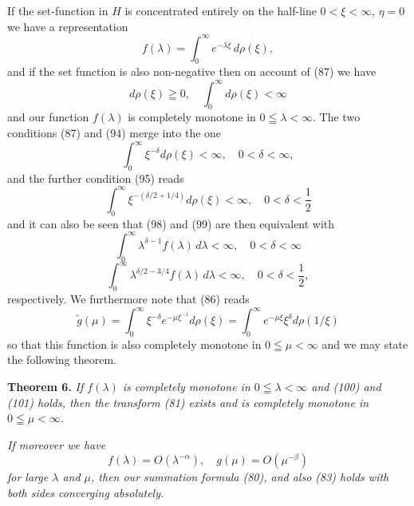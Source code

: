 \documentclass[12pt]{article}
\begin{document}
If the set-function in \(H\) is concentrated entirely on the half-line \(0 < \xi < \infty\), \(\eta = 0\) we have a representation
\begin{equation}
f(\lambda) = \int_0^{\infty} e^{-\lambda\xi} \, d\rho(\xi),
\tag{96}
\end{equation}
and if the set function is also non-negative then on account of (87) we have
\begin{equation}
d\rho(\xi) \geqq 0, \quad \int_0^{\infty} d\rho(\xi) < \infty
\tag{97}
\end{equation}
and our function \(f(\lambda)\) is completely monotone in \(0 \leqq \lambda < \infty\). The two conditions (87) and (94) merge into the one
\begin{equation}
\int_0^{\infty} \xi^{-\delta} d\rho(\xi) < \infty, \quad 0 < \delta < \infty,
\tag{98}
\end{equation}
and the further condition (95) reads
\begin{equation}
\int_0^{\infty} \xi^{-(\delta/2+1/4)} d\rho(\xi) < \infty, \quad 0 < \delta < \frac{1}{2}
\tag{99}
\end{equation}
and it can also be seen that (98) and (99) are then equivalent with
\begin{equation}
\int_0^{\infty} \lambda^{\delta-1} f(\lambda) \, d\lambda < \infty, \quad 0 < \delta < \infty
\tag{100}
\end{equation}
\begin{equation}
\int_0^{\infty} \lambda^{\delta/2-3/4} f(\lambda) \, d\lambda < \infty, \quad 0 < \delta < \frac{1}{2},
\tag{101}
\end{equation}
respectively. We furthermore note that (86) reads
\begin{equation}
\tilde{g}(\mu) = \int_0^{\infty} \xi^{-\delta} e^{-\mu\xi^{-1}} d\rho(\xi) = \int_0^{\infty} e^{-\mu\xi} \xi^\delta d\rho(1/\xi)
\tag{102}
\end{equation}
so that this function is also completely monotone in \(0 \leqq \mu < \infty\) and we may state the following theorem.

\medskip

\noindent\textbf{Theorem 6.} \emph{If \(f(\lambda)\) is completely monotone in \(0 \leqq \lambda < \infty\) and (100) and (101) holds, then the transform (81) exists and is completely monotone in \(0 \leqq \mu < \infty\).}

\emph{If moreover we have}
\begin{equation}
f(\lambda) = O(\lambda^{-\alpha}), \quad g(\mu) = O(\mu^{-\beta})
\tag{103}
\end{equation}
\emph{for large \(\lambda\) and \(\mu\), then our summation formula (80), and also (83) holds with both sides converging absolutely.}
\end{document}
